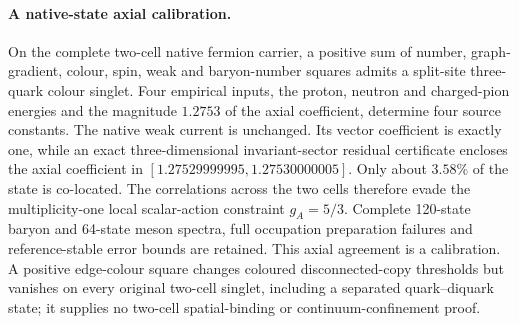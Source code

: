 \paragraph{A native-state axial calibration.}
On the complete two-cell native fermion carrier, a positive sum of number,
graph-gradient, colour, spin, weak and baryon-number squares admits a
split-site three-quark colour singlet. Four empirical inputs, the proton,
neutron and charged-pion energies and the magnitude $1.2753$ of the axial
coefficient, determine four source constants. The native weak current is
unchanged. Its vector coefficient is exactly one, while an exact
three-dimensional invariant-sector residual certificate encloses the axial
coefficient in $[1.27529999995,1.27530000005]$. Only about $3.58\%$ of the
state is co-located. The correlations across the two cells therefore evade
the multiplicity-one local scalar-action constraint $g_A=5/3$.
Complete 120-state baryon and 64-state meson spectra, full occupation
preparation failures and reference-stable error bounds are retained.
This axial agreement is a calibration. A positive edge-colour square
changes coloured disconnected-copy thresholds but vanishes on every
original two-cell singlet, including a separated quark--diquark state;
it supplies no two-cell spatial-binding or continuum-confinement proof.
